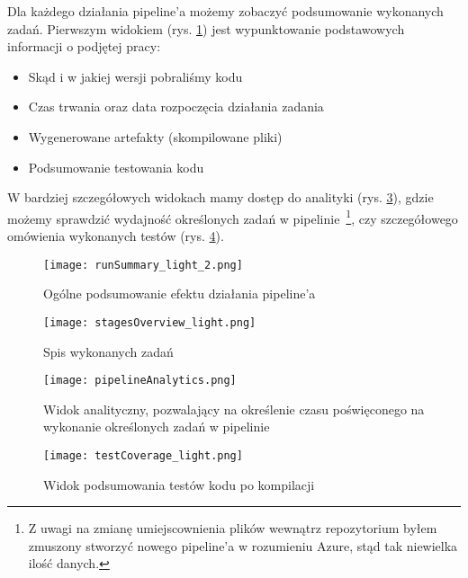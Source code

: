 Dla każdego działania pipeline'a możemy zobaczyć podsumowanie wykonanych zadań.
Pierwszym widokiem (rys. \ref{img:runSummary}) jest wypunktowanie podstawowych informacji o podjętej pracy:
\begin{itemize}
    \item Skąd i w jakiej wersji pobraliśmy kodu
    \item Czas trwania oraz data rozpoczęcia działania zadania
    \item Wygenerowane artefakty (skompilowane pliki)
    \item Podsumowanie testowania kodu
\end{itemize}

W bardziej szczegółowych widokach mamy dostęp do analityki (rys. \ref{img:pipelineAnalytics}), 
gdzie możemy sprawdzić wydajność określonych zadań w pipelinie~\footnote{%
    Z uwagi na zmianę umiejscownienia plików wewnątrz repozytorium byłem zmuszony stworzyć 
    nowego pipeline'a w rozumieniu Azure, stąd tak niewielka ilość danych.
}, czy szczegółowego omówienia wykonanych testów (rys. \ref{img:testCoverage}).
\clearpage

\begin{figure}[!ht]
    \centering
    \texttt{[image: runSummary\_light\_2.png]}
    \caption{Ogólne podsumowanie efektu działania pipeline'a}
    \label{img:runSummary}
\end{figure}

\begin{figure}[!ht]
    \centering
    \texttt{[image: stagesOverview\_light.png]}
    \caption{Spis wykonanych zadań}
    \label{img:stagesOverview}
\end{figure}

\begin{figure}[!ht]
    \centering
    \texttt{[image: pipelineAnalytics.png]}
    \caption{Widok analityczny, pozwalający na określenie czasu poświęconego na wykonanie
        określonych zadań w pipelinie}
    \label{img:pipelineAnalytics}
\end{figure}


\begin{figure}[!hb]
    \centering
    \texttt{[image: testCoverage\_light.png]}
    \caption{Widok podsumowania testów kodu po kompilacji}
    \label{img:testCoverage}
\end{figure}

\restoregeometry
